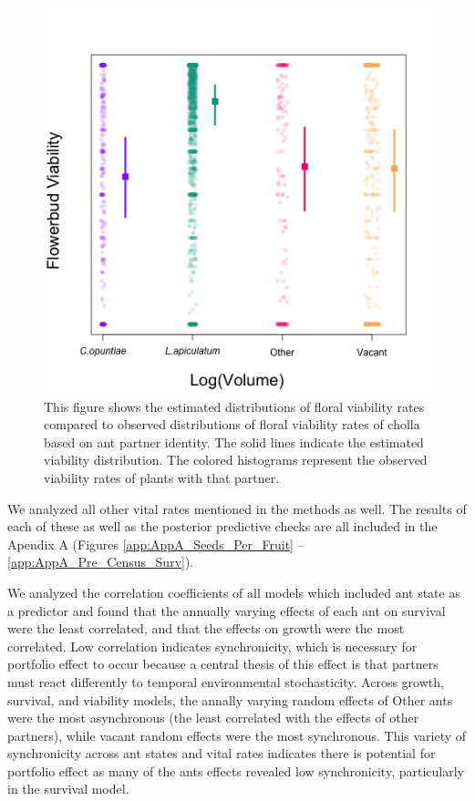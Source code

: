 \documentclass[11pt]{article}
\begin{document}
\begin{figure}[H]
	\includegraphics[width=0.95\linewidth]{Figures/viab.png}
	\caption{This figure shows the estimated distributions of floral viability rates compared to observed distributions of floral viability rates of cholla based on ant partner identity. The solid lines indicate the estimated viability distribution. The colored histograms represent the observed viability rates of plants with that partner. }
	\label{fig:Viab}
\end{figure}

We analyzed all other vital rates mentioned in the methods as well.
The results of each of these as well as the posterior predictive checks are all included in the Apendix A (Figures \ref{app:AppA_Seeds_Per_Fruit} -- \ref{app:AppA_Pre_Census_Surv}).

We analyzed the correlation coefficients of all models which included ant state as a predictor and found that the annually varying effects of each ant on survival were the least correlated, and that the effects on growth were the most correlated. 
Low correlation indicates synchronicity, which is necessary for portfolio effect to occur because a central thesis of this effect is that partners must react differently to temporal environmental stochasticity.
Across growth, survival, and viability models, the annally varying random effects of Other ants were the most asynchronous (the least correlated with the effects of other partners), while vacant random effects were the most synchronous. 
This variety of synchronicity across ant states and vital rates indicates there is potential for portfolio effect as many of the ants effects revealed low synchronicity, particularly in the survival model. 
\end{document}
